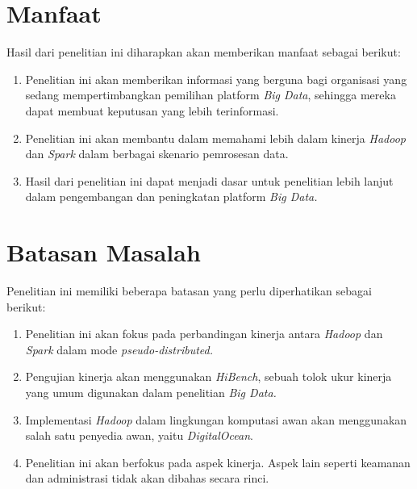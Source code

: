 \section{Manfaat}
Hasil dari penelitian ini diharapkan akan memberikan manfaat sebagai berikut:\begin{enumerate}
	\item 
	Penelitian ini akan memberikan informasi yang berguna bagi organisasi yang sedang mempertimbangkan pemilihan platform \textit{Big Data}, sehingga mereka dapat membuat keputusan yang lebih terinformasi.	
	\item
	Penelitian ini akan membantu dalam memahami lebih dalam kinerja \textit{Hadoop} dan \textit{Spark} dalam berbagai skenario pemrosesan data.
	\item
	Hasil dari penelitian ini dapat menjadi dasar untuk penelitian lebih lanjut dalam pengembangan dan peningkatan platform \textit{Big Data.}
\end{enumerate}


\section{Batasan Masalah}
Penelitian ini memiliki beberapa batasan yang perlu diperhatikan sebagai berikut:
	\begin{enumerate}
		\item 
		Penelitian ini akan fokus pada perbandingan kinerja antara \textit{Hadoop} dan \textit{Spark} dalam mode \textit{pseudo-distributed.}
		\item
		Pengujian kinerja akan menggunakan \textit{HiBench}, sebuah tolok ukur kinerja yang umum digunakan dalam penelitian \textit{Big Data.}
		\item
		Implementasi \textit{Hadoop} dalam lingkungan komputasi awan akan menggunakan salah satu penyedia awan, yaitu \textit{DigitalOcean}.
		\item
		Penelitian ini akan berfokus pada aspek kinerja. Aspek lain seperti keamanan dan administrasi tidak akan dibahas secara rinci.
	\end{enumerate}